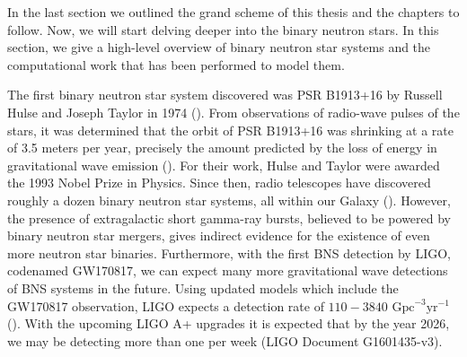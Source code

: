 


In the last section we outlined the grand scheme of this thesis and the chapters to follow. Now, we will start delving deeper into the binary neutron stars. In this section, we give a high-level overview of binary neutron star systems and the computational work that has been performed to model them. 


The first binary neutron star system discovered was PSR B1913+16 by Russell Hulse and Joseph Taylor in 1974 (\citet*{hulse:1975uf}). From observations of radio-wave pulses of the stars, it was determined that the orbit of PSR B1913+16 was shrinking at a rate of 3.5 meters per year, precisely the amount predicted by the loss of energy in gravitational wave emission (\citet*{1981sciam.245...74w}). For their work, Hulse and Taylor were awarded the 1993 Nobel Prize in Physics. Since then, radio telescopes have discovered roughly a dozen binary neutron star systems, all within our Galaxy (\citet*{baiottireview2016}). However, the presence of extragalactic short gamma-ray bursts, believed to be powered by binary neutron star mergers, gives indirect evidence for the existence of even more neutron star binaries. Furthermore, with the first BNS detection by LIGO, codenamed GW170817, we can expect many more gravitational wave detections of BNS systems in the future. Using updated models which include the GW170817 observation, LIGO expects a detection rate of $110-3840$ $\text{Gpc}^{-3} \text{yr}^{-1}$ (\citet*{ligo2018gwtc}).  With the upcoming LIGO A+ upgrades it is expected that by the year 2026, we may be detecting more than one per week (LIGO Document G1601435-v3).

